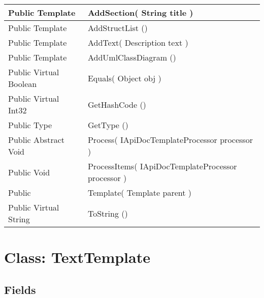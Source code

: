 \documentclass[11pt, oneside, a4paper]{book}
\begin{document}
\begin{center}
\begin{tabular}{| p{3cm} | p{12cm} | }
\hline
 Public  Template &  AddSection(\hypertarget{SoftwareEngineeringTools.{}Documentation.{}Template.{}AddSection\_String}{} String  title  )\\
\hline
 Public  Template &  AddStructList ()\hypertarget{SoftwareEngineeringTools.{}Documentation.{}Template.{}AddStructList}{}\\
\hline
 Public  Template &  AddText(\hypertarget{SoftwareEngineeringTools.{}Documentation.{}Template.{}AddText\_Description}{} Description  text  )\\
\hline
 Public  Template &  AddUmlClassDiagram ()\hypertarget{SoftwareEngineeringTools.{}Documentation.{}Template.{}AddUmlClassDiagram}{}\\
\hline
 Public  Virtual  Boolean &  Equals(\hypertarget{SoftwareEngineeringTools.{}Documentation.{}Template.{}Equals\_Object}{} Object  obj  )\\
\hline
 Public  Virtual  Int32 &  GetHashCode ()\hypertarget{SoftwareEngineeringTools.{}Documentation.{}Template.{}GetHashCode}{}\\
\hline
 Public  Type &  GetType ()\hypertarget{SoftwareEngineeringTools.{}Documentation.{}Template.{}GetType}{}\\
\hline
 Public  Abstract  Void &  Process(\hypertarget{SoftwareEngineeringTools.{}Documentation.{}Template.{}Process\_IApiDocTemplateProcessor}{} IApiDocTemplateProcessor  processor  )\\
\hline
 Public  Void &  ProcessItems(\hypertarget{SoftwareEngineeringTools.{}Documentation.{}Template.{}ProcessItems\_IApiDocTemplateProcessor}{} IApiDocTemplateProcessor  processor  )\\
\hline
 Public  &  Template(\hypertarget{SoftwareEngineeringTools.{}Documentation.{}Template.{}Template\_Template}{} Template  parent  )\\
\hline
 Public  Virtual  String &  ToString ()\hypertarget{SoftwareEngineeringTools.{}Documentation.{}Template.{}ToString}{}\\
\hline
\end{tabular}
\end{center}
 


\hypertarget{SoftwareEngineeringTools.{}Documentation.{}TextTemplate}{}
\section{Class: TextTemplate}

\subsection{Fields}
\end{document}
